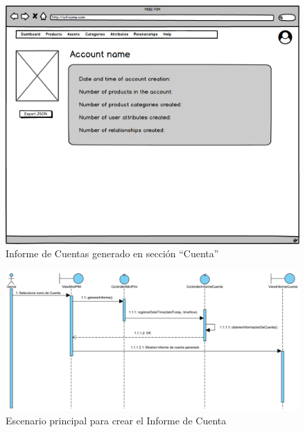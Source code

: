 \begin{figure}[H]
    \includegraphics[width=1\linewidth]{assets/mockups/RF1.9CrearInformeCuenta.png}
    \caption{Informe de Cuentas generado en sección \enquote{Cuenta}}
   \end{figure}
\vspace{1.0cm}

\newpage %

\begin{figure}[H]
    \includegraphics[width=1\linewidth]{assets/sequence/RF1.9_CrearInformeCuenta_v2.png}
    \caption{Escenario principal para crear el Informe de Cuenta}
   \end{figure}
\vspace{1.0cm}

\newpage %